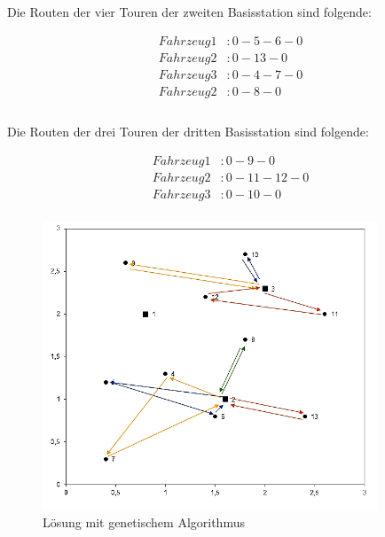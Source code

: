 \documentclass[a4paper,12pt,parskip,bibtotoc,liststotoc]{article}
\begin{document}
Die Routen der vier Touren der zweiten Basisstation sind folgende: 

\begin{equation} \label{eq:test}
    \begin{aligned} 
         Fahrzeug 1&: 0 - 5 - 6 - 0 \\
        Fahrzeug 2&: 0 - 13 - 0\\
        Fahrzeug 3&: 0 - 4 - 7 - 0\\
        Fahrzeug 2&: 0 - 8 - 0\\
    \end{aligned}
\end{equation}\\

Die Routen der drei Touren der dritten Basisstation sind folgende: 

\begin{equation} \label{eq:test}
    \begin{aligned} 
         Fahrzeug 1&: 0 - 9 - 0 \\
        Fahrzeug 2&: 0 - 11 - 12 - 0\\
         Fahrzeug 3&: 0 - 10 - 0\\
    \end{aligned}
\end{equation}



\begin{figure}[h!]
  \begin{center}
      \includegraphics[width=100mm]{vrp33a.png}
    \caption{Lösung mit genetischem Algorithmus}  \label{Typen}
  \end{center}
\end{figure}
\end{document}
